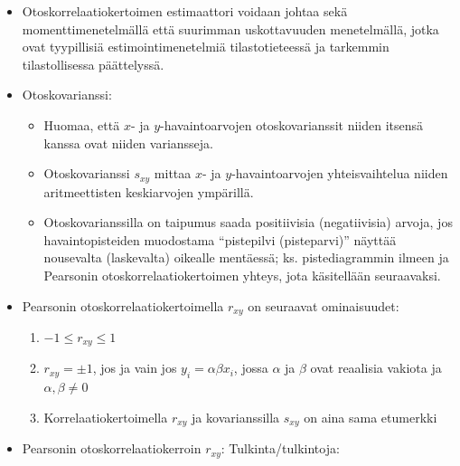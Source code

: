 \documentclass[
]{book}
\providecommand{\tightlist}{%
  \setlength{\itemsep}{0pt}\setlength{\parskip}{0pt}}
\begin{document}
\begin{itemize}
\item
  Otoskorrelaatiokertoimen estimaattori voidaan johtaa sekä momenttimenetelmällä että suurimman uskottavuuden menetelmällä, jotka ovat tyypillisiä estimointimenetelmiä tilastotieteessä ja tarkemmin tilastollisessa päättelyssä.
\item
  Otoskovarianssi:

  \begin{itemize}
  \tightlist
  \item
    Huomaa, että \(x\)- ja \(y\)-havaintoarvojen otoskovarianssit niiden itsensä kanssa ovat niiden variansseja.
  \item
    Otoskovarianssi \(s_{xy}\) mittaa \(x\)- ja \(y\)-havaintoarvojen yhteisvaihtelua niiden aritmeettisten keskiarvojen ympärillä.
  \item
    Otoskovarianssilla on taipumus saada positiivisia (negatiivisia) arvoja, jos havaintopisteiden muodostama ``pistepilvi (pisteparvi)'' näyttää nousevalta (laskevalta) oikealle mentäessä; ks. pistediagrammin ilmeen ja Pearsonin otoskorrelaatiokertoimen yhteys, jota käsitellään seuraavaksi.
  \end{itemize}
\item
  Pearsonin otoskorrelaatiokertoimella \(r_{xy}\) on seuraavat ominaisuudet:

  \begin{enumerate}
  \def\labelenumi{\roman{enumi})}
  \tightlist
  \item
    \(-1 \le r_{xy} \le 1\)
  \item
    \(r_{xy} = \pm 1\), jos ja vain jos \(y_i = \alpha \beta x_i\), jossa \(\alpha\) ja \(\beta\) ovat reaalisia vakiota ja \(\alpha,\beta \neq 0\)
  \item
    Korrelaatiokertoimella \(r_{xy}\) ja kovarianssilla \(s_{xy}\) on aina sama etumerkki
  \end{enumerate}
\item
  Pearsonin otoskorrelaatiokerroin \(r_{xy}\): Tulkinta/tulkintoja:


\end{itemize}
\end{document}
